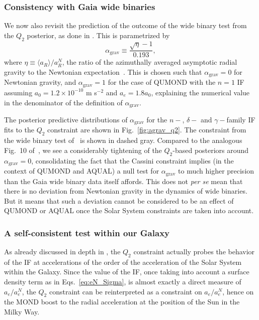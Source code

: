 \documentclass[reprint,nofootinbib,prd,aps]{revtex4-2}
\newcommand{\ag}{\alpha_\text{grav}}
\begin{document}
\subsubsection{Consistency with Gaia wide binaries}
We now also revisit the prediction of the outcome of the wide binary test from the $Q_2$ posterior, as done in \cite{Desmond_Cassini}. This is parametrized by
\begin{equation}\label{eq:ag}
\ag \equiv \frac{\sqrt{\eta}-1}{0.193},
\end{equation}
where $\eta \equiv \langle a_R \rangle / a^N_R$, the ratio of the 
azimuthally averaged asymptotic radial gravity to the Newtonian expectation~\citep{Banik_WBT}. This is chosen such that $\ag=0$ for Newtonian gravity, and $\ag=1$ for the case of QUMOND with the $n=1$ IF assuming $a_0=1.2\times10^{-10}$ m s$^{-2}$ and $a_e= 1.8a_0$, explaining the numerical value in the denominator of the definition of $\alpha_\textrm{grav}$.

The posterior predictive distributions of $\ag$ for the $n-$, $\delta-$ and $\gamma-$family IF fits to the $Q_2$ constraint are shown in Fig.~\ref{fig:agrav_q2}. The constraint from the wide binary test of~\cite{Banik_WBT} is shown in dashed gray. Compared to the analogous Fig.~10 of~\cite{Desmond_Cassini}, we see a considerably tightening of the $Q_2$-based posteriors around $\ag=0$, consolidating the fact that the Cassini constraint implies (in the context of QUMOND and AQUAL) a null test for $\ag$ to much higher precision than the Gaia wide binary data itself affords. This does not {\it per se} mean that there is no deviation from Newtonian gravity in the dynamics of wide binaries. But it means that such a deviation cannot be considered to be an effect of QUMOND or AQUAL once the Solar System constraints are taken into account. 

\subsubsection{A self-consistent test within our Galaxy}\label{sec:test_MOND_MW}
As already discussed in depth in \cite{Desmond_Cassini}, the $Q_2$ constraint actually probes the behavior of the IF at accelerations of the order of the acceleration of the Solar System within the Galaxy. Since the value of the IF, once taking into account a surface density term as in Eqs.~\eqref{eq:eN_Sigma}, is almost exactly a direct measure of $a_e/a^N_e$, the $Q_2$ constraint can be reinterpreted as a constraint on $a_e/a^N_e$, hence on the MOND boost to the radial acceleration at the position of the Sun in the Milky Way.
\end{document}
